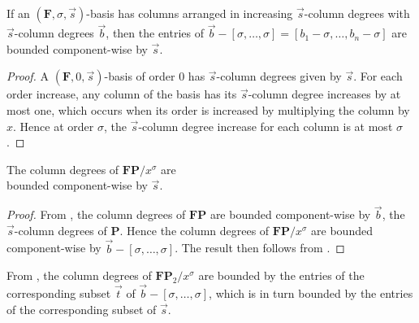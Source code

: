 \begin{lem}
\label{lem:boundOnShiftedDegrees}%
If an $(\mathbf{F},\sigma,\vec{s})$-basis has columns arranged in
increasing $\vec{s}$-column degrees with $\vec{s}$-column degrees
$\vec{b}$, then the entries of $\vec{b}-[\sigma,\dots,\sigma]=\left[b_{1}-\sigma,\dots,b_{n}-\sigma\right]$
are bounded component-wise by $\vec{s}$. \end{lem}
\begin{proof}
A $(\mathbf{F},0,\vec{s})$-basis of order $0$ has $\vec{s}$-column
degrees given by $\vec{s}$. For each order increase, any column of
the basis has its $\vec{s}$-column degree increases by at most one,
which occurs when its order is increased by multiplying the column
by $x$. Hence at order $\sigma$, the $\vec{s}$-column degree increase
for each column is at most $\sigma$. \end{proof}
\begin{cor}
\label{cor:boundOnFPAfterLowerTermsRemoved}The column degrees of
$\mathbf{F}\mathbf{P}/x^{\sigma}$ are \\
bounded component-wise by $\vec{s}$.\end{cor}
\begin{proof}
From , the column degrees of $\mathbf{F}\mathbf{P}$
are bounded component-wise by $\vec{b}$, the $\vec{s}$-column degrees
of $\mathbf{P}$. Hence the column degrees of $\mathbf{F}\mathbf{P}/x^{\sigma}$
are bounded component-wise by $\vec{b}-[\sigma,\dots,\sigma]$. The
result then follows from . 
\end{proof}
From , the column
degrees of $\mathbf{F}\mathbf{P}_{2}/x^{\sigma}$ are bounded by the
entries of the corresponding subset $\vec{t}$ of $\vec{b}-[\sigma,\dots,\sigma]$,
which is in turn bounded by the entries of the corresponding subset
of $\vec{s}$. 
